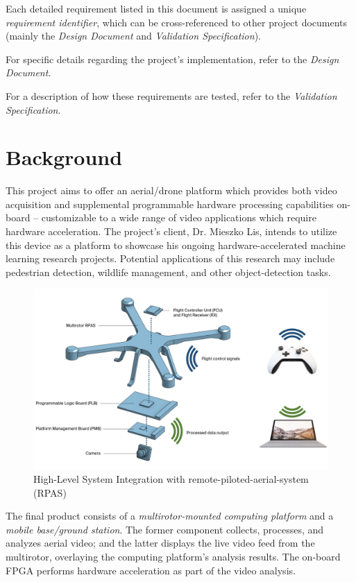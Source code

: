 \documentclass[10pt,letterpaper]{article}
\begin{document}
Each detailed requirement listed in this document is assigned a unique \textit{requirement identifier}, which can be cross-referenced to other project documents (mainly the \textit{Design Document} and \textit{Validation Specification}). 

For specific details regarding the project's implementation, refer to the \textit{Design Document}.

For a description of how these requirements are tested, refer to the \textit{Validation Specification}.

\newpage
\section{Background}

This project aims to offer an aerial/drone platform which provides both video acquisition and supplemental programmable hardware processing capabilities on-board -- customizable to a wide range of video applications which require hardware acceleration. The project's client, Dr. Mieszko Lis, intends to utilize this device as a platform to showcase his ongoing hardware-accelerated machine learning research projects. Potential applications of this research may include pedestrian detection, wildlife management, and other object-detection tasks.

\begin{figure}[H]
    \centering
    \includegraphics[width=\linewidth]{intpic.png}
\caption{High-Level System Integration with remote-piloted-aerial-system (RPAS)}
\label{hlpic}
\end{figure}

The final product consists of a \textit{multirotor-mounted computing platform} and a \textit{mobile base/ground station}. The former component collects, processes, and analyzes aerial video; and the latter displays the live video feed from the multirotor, overlaying the computing platform's analysis results. The on-board FPGA performs hardware acceleration as part of the video analysis.
\end{document}

